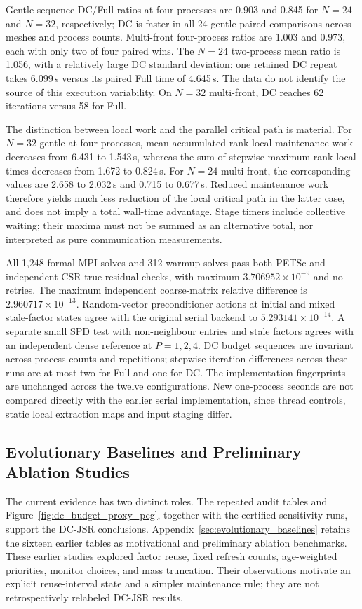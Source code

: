 \documentclass[preprint,12pt,3p]{elsarticle}
\begin{document}
Gentle-sequence DC/Full ratios at four processes are 0.903 and 0.845 for
$N=24$ and $N=32$, respectively; DC is faster in all 24 gentle paired
comparisons across meshes and process counts. Multi-front four-process ratios
are 1.003 and 0.973, each with only two of four paired wins. The $N=24$
two-process mean ratio is 1.056, with a relatively large DC standard deviation:
one retained DC repeat takes 6.099\,s versus its paired Full time of 4.645\,s.
The data do not identify the source of this execution variability.
On $N=32$ multi-front, DC reaches 62 iterations versus 58 for Full.

The distinction between local work and the parallel critical path is material.
For $N=32$ gentle at four processes, mean accumulated rank-local maintenance
work decreases from 6.431 to 1.543\,s, whereas the sum of stepwise maximum-rank
local times decreases from 1.672 to 0.824\,s. For $N=24$ multi-front, the
corresponding values are 2.658 to 2.032\,s and 0.715 to 0.677\,s. Reduced
maintenance work therefore yields much less reduction of the local critical
path in the latter case, and does not imply a total wall-time advantage.
Stage timers include collective waiting; their maxima must not be summed
as an alternative total, nor interpreted as pure communication measurements.

All 1,248 formal MPI solves and 312 warmup solves pass both PETSc and independent
CSR true-residual checks, with maximum $3.706952\times10^{-9}$ and no retries.
The maximum independent coarse-matrix relative difference is
$2.960717\times10^{-13}$. Random-vector preconditioner actions at initial and
mixed stale-factor states agree with the original serial backend to
$5.293141\times10^{-14}$. A separate small SPD test with non-neighbour entries
and stale factors agrees with an independent dense reference at $P=1,2,4$.
DC budget sequences are invariant across process counts and repetitions;
stepwise iteration differences across these runs are at most two for Full
and one for DC. The implementation fingerprints are unchanged across the
twelve configurations. New one-process seconds are not compared directly
with the earlier serial implementation, since thread controls, static local
extraction maps and input staging differ.

\subsection{Evolutionary Baselines and Preliminary Ablation Studies}
\label{subsec:dc_evolutionary_context}
The current evidence has two distinct roles. The repeated audit tables and
Figure~\ref{fig:dc_budget_proxy_pcg}, together with the certified sensitivity
runs, support the DC-JSR conclusions. Appendix~\ref{sec:evolutionary_baselines}
retains the sixteen earlier tables as motivational and preliminary ablation
benchmarks. These earlier studies explored factor reuse, fixed refresh
counts, age-weighted priorities, monitor choices, and mass truncation.
Their observations motivate an explicit reuse-interval state and a simpler
maintenance rule; they are not retrospectively relabeled DC-JSR results.
\end{document}
